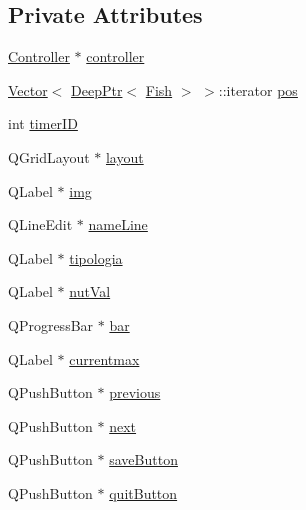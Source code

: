 \subsection*{Private Attributes}
\begin{DoxyCompactItemize}
\item 
\hyperlink{classController}{Controller} $\ast$ \hyperlink{classFishInfoView_a55d7f45ff776d535d8e9f19f3ab222fb_a55d7f45ff776d535d8e9f19f3ab222fb}{controller}
\item 
\hyperlink{classVector}{Vector}$<$ \hyperlink{classDeepPtr}{Deep\+Ptr}$<$ \hyperlink{classFish}{Fish} $>$ $>$\+::iterator \hyperlink{classFishInfoView_aef313e02efb19ca493e38a670d00031d_aef313e02efb19ca493e38a670d00031d}{pos}
\item 
int \hyperlink{classFishInfoView_a9f28deb4966d0920e59731b01d413379_a9f28deb4966d0920e59731b01d413379}{timer\+ID}
\item 
Q\+Grid\+Layout $\ast$ \hyperlink{classFishInfoView_a5e6524166611597c5cf026cce623e0b5_a5e6524166611597c5cf026cce623e0b5}{layout}
\item 
Q\+Label $\ast$ \hyperlink{classFishInfoView_a042e425491ce018a58ce8eb57f52b19e_a042e425491ce018a58ce8eb57f52b19e}{img}
\item 
Q\+Line\+Edit $\ast$ \hyperlink{classFishInfoView_ade293fb24ac7424ce5bde859f0358c70_ade293fb24ac7424ce5bde859f0358c70}{name\+Line}
\item 
Q\+Label $\ast$ \hyperlink{classFishInfoView_a11aef88bcc65dde952faf47608712738_a11aef88bcc65dde952faf47608712738}{tipologia}
\item 
Q\+Label $\ast$ \hyperlink{classFishInfoView_adaa7f10c903bbe239d619bd86b1b98f5_adaa7f10c903bbe239d619bd86b1b98f5}{nut\+Val}
\item 
Q\+Progress\+Bar $\ast$ \hyperlink{classFishInfoView_a8aad7d3739b1163cacd402ae4cdf47f3_a8aad7d3739b1163cacd402ae4cdf47f3}{bar}
\item 
Q\+Label $\ast$ \hyperlink{classFishInfoView_a9642ead7f4c184cc45556ec8c7346360_a9642ead7f4c184cc45556ec8c7346360}{currentmax}
\item 
Q\+Push\+Button $\ast$ \hyperlink{classFishInfoView_ad22f1d85269cb0dcd7e93eee334bcfc4_ad22f1d85269cb0dcd7e93eee334bcfc4}{previous}
\item 
Q\+Push\+Button $\ast$ \hyperlink{classFishInfoView_aab50a28d3c4ff2e4879f2f4b539aafa5_aab50a28d3c4ff2e4879f2f4b539aafa5}{next}
\item 
Q\+Push\+Button $\ast$ \hyperlink{classFishInfoView_ab28f33062ed6675b3fbb6a79f4d5caa3_ab28f33062ed6675b3fbb6a79f4d5caa3}{save\+Button}
\item 
Q\+Push\+Button $\ast$ \hyperlink{classFishInfoView_a3e7e3f83d45132ee69dcaf3f7e73de93_a3e7e3f83d45132ee69dcaf3f7e73de93}{quit\+Button}
\end{DoxyCompactItemize}


